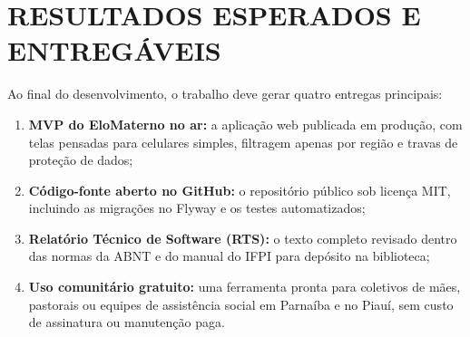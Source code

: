 \section{RESULTADOS ESPERADOS E ENTREGÁVEIS}

Ao final do desenvolvimento, o trabalho deve gerar quatro entregas principais:

\begin{enumerate}
    \item \textbf{MVP do EloMaterno no ar:} a aplicação web publicada em produção, com telas pensadas para celulares simples, filtragem apenas por região e travas de proteção de dados;
    \item \textbf{Código-fonte aberto no GitHub:} o repositório público sob licença MIT, incluindo as migrações no Flyway e os testes automatizados;
    \item \textbf{Relatório Técnico de Software (RTS):} o texto completo revisado dentro das normas da ABNT e do manual do IFPI para depósito na biblioteca;
    \item \textbf{Uso comunitário gratuito:} uma ferramenta pronta para coletivos de mães, pastorais ou equipes de assistência social em Parnaíba e no Piauí, sem custo de assinatura ou manutenção paga.
\end{enumerate}
